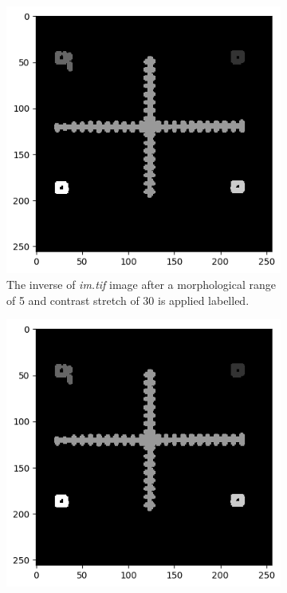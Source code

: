 \documentclass{article}
\begin{document}
\begin{figure}[htb]
\end{figure}

\begin{figure}[htb]
    \centering 
\begin{subfigure}{0.4\textwidth}
  \includegraphics[width=\linewidth]{Report/Appendix_Images/black1.png}
  \caption{The inverse of \emph{im.tif} image after a morphological range of 5 and contrast stretch of 30 is applied labelled. }
  \label{fig:1}
\end{subfigure}\hfil 
\begin{subfigure}{0.4\textwidth}
  \includegraphics[width=\linewidth]{Report/Appendix_Images/black2.png}

\end{subfigure}
\end{figure}
\end{document}
